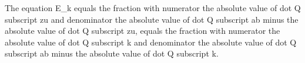 The equation E_k equals the fraction with numerator the absolute value of dot Q subscript zu and denominator the absolute value of dot Q subscript ab minus the absolute value of dot Q subscript zu, equals the fraction with numerator the absolute value of dot Q subscript k and denominator the absolute value of dot Q subscript ab minus the absolute value of dot Q subscript k.